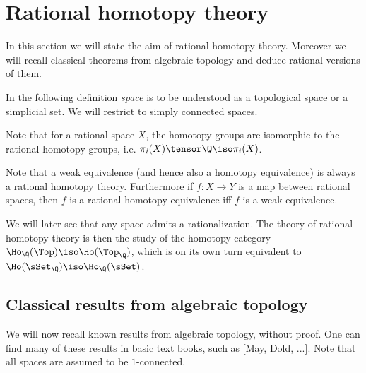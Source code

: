 
\section{Rational homotopy theory}
\label{sec:rational}

In this section we will state the aim of rational homotopy theory. Moreover we will recall classical theorems from algebraic topology and deduce rational versions of them.

In the following definition \emph{space} is to be understood as a topological space or a simplicial set. We will restrict to simply connected spaces.



Note that for a rational space $X$, the homotopy groups are isomorphic to the rational homotopy groups, i.e. $\pi_i(X) \tensor \Q \iso \pi_i(X)$.



Note that a weak equivalence (and hence also a homotopy equivalence) is always a rational homotopy theory. Furthermore if $f: X \to Y$ is a map between rational spaces, then $f$ is a rational homotopy equivalence iff $f$ is a weak equivalence.

We will later see that any space admits a rationalization. The theory of rational homotopy theory is then the study of the homotopy category $\Ho_\Q(\Top) \iso \Ho(\Top_\Q)$, which is on its own turn equivalent to $\Ho(\sSet_\Q) \iso \Ho_\Q(\sSet)$.

\subsection{Classical results from algebraic topology}

We will now recall known results from algebraic topology, without proof. One can find many of these results in basic text books, such as [May, Dold, ...]. Note that all spaces are assumed to be $1$-connected.

